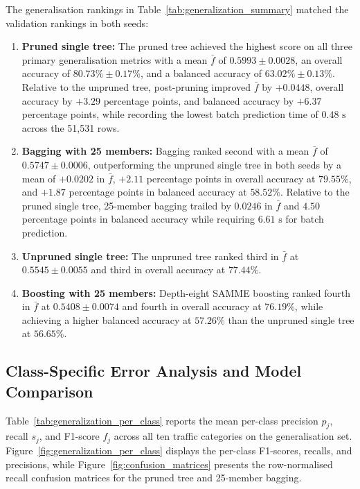 The generalisation rankings in Table~\ref{tab:generalization_summary} matched the validation rankings in both seeds:
\begin{enumerate}
    \item \textbf{Pruned single tree:} The pruned tree achieved the highest score on all three primary generalisation metrics with a mean $\bar{f}$ of $0.5993 \pm 0.0028$, an overall accuracy of $80.73\% \pm 0.17\%$, and a balanced accuracy of $63.02\% \pm 0.13\%$. Relative to the unpruned tree, post-pruning improved $\bar{f}$ by $+0.0448$, overall accuracy by $+3.29$ percentage points, and balanced accuracy by $+6.37$ percentage points, while recording the lowest batch prediction time of $0.48\text{ s}$ across the 51,531 rows.
    \item \textbf{Bagging with 25 members:} Bagging ranked second with a mean $\bar{f}$ of $0.5747 \pm 0.0006$, outperforming the unpruned single tree in both seeds by a mean of $+0.0202$ in $\bar{f}$, $+2.11$ percentage points in overall accuracy at $79.55\%$, and $+1.87$ percentage points in balanced accuracy at $58.52\%$. Relative to the pruned single tree, 25-member bagging trailed by $0.0246$ in $\bar{f}$ and $4.50$ percentage points in balanced accuracy while requiring $6.61\text{ s}$ for batch prediction.
    \item \textbf{Unpruned single tree:} The unpruned tree ranked third in $\bar{f}$ at $0.5545 \pm 0.0055$ and third in overall accuracy at $77.44\%$.
    \item \textbf{Boosting with 25 members:} Depth-eight SAMME boosting ranked fourth in $\bar{f}$ at $0.5408 \pm 0.0074$ and fourth in overall accuracy at $76.19\%$, while achieving a higher balanced accuracy at $57.26\%$ than the unpruned single tree at $56.65\%$.
\end{enumerate}

\subsection{Class-Specific Error Analysis and Model Comparison}
\label{subsec:res_perclass}
Table~\ref{tab:generalization_per_class} reports the mean per-class precision $p_j$, recall $s_j$, and F1-score $f_j$ across all ten traffic categories on the generalisation set. Figure~\ref{fig:generalization_per_class} displays the per-class F1-scores, recalls, and precisions, while Figure~\ref{fig:confusion_matrices} presents the row-normalised recall confusion matrices for the pruned tree and 25-member bagging.

